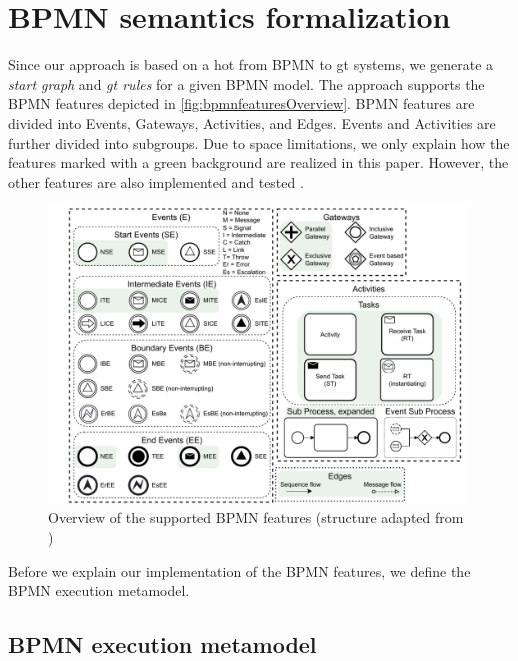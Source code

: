 \documentclass[runningheads]{llncs}
\begin{document}
\section{BPMN semantics formalization} \label{sec:formalization}

Since our approach is based on a \gls*{hot} from BPMN to \gls*{gt} systems, we generate a \emph{start graph} and \emph{\gls*{gt} rules} for a given BPMN model.
The approach supports the BPMN features depicted in \autoref{fig:bpmnfeaturesOverview}.
BPMN features are divided into \textsf{Events}, \textsf{Gateways}, \textsf{Activities}, and \textsf{Edges}.
\textsf{Events} and \textsf{Activities} are further divided into subgroups.
Due to space limitations, we only explain how the features marked with a green background are realized in this paper.
However, the other features are also implemented and tested \cite{krauterArtifactsICGT2023}.

\begin{figure}[ht]
    \centering
    \includegraphics[width=0.99\textwidth]{images/bpmn_semantics-feature-overview.pdf}
    \caption{Overview of the supported BPMN features (structure adapted from \cite{houhouFirstOrderLogicVerification2022})}
    \label{fig:bpmnfeaturesOverview}
\end{figure}

Before we explain our implementation of the BPMN features, we define the BPMN execution metamodel.

\subsection{BPMN execution metamodel}
\end{document}
